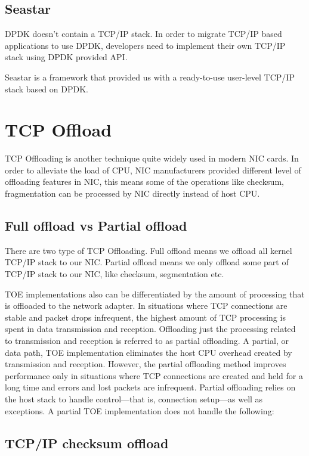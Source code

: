 \documentclass[bsc,frontabs,twoside,singlespacing,parskip,deptreport]{infthesis}     %
\begin{document}
\subsection{Seastar}
DPDK doesn't contain a TCP/IP stack. In order to migrate TCP/IP based applications to use DPDK, developers need to implement their own TCP/IP stack using DPDK provided API. 

Seastar\cite{seastar} is a framework that provided us with a ready-to-use user-level TCP/IP stack based on DPDK.


\section{TCP Offload}
TCP Offloading is another technique quite widely used in modern NIC cards. In order to alleviate the load of CPU, NIC manufacturers provided different level of offloading features in NIC, this means some of the operations like checksum, fragmentation can be processed by NIC directly instead of host CPU. 


\subsection{Full offload vs Partial offload}


There are two type of TCP Offloading. Full offload means we offload all kernel TCP/IP stack to our NIC. Partial offload means we only offload some part of TCP/IP stack to our NIC, like checksum, segmentation etc. 



TOE implementations also can be differentiated by the amount of processing that is offloaded to the network adapter. In situations where TCP connections are stable and packet drops infrequent, the highest amount of TCP processing is spent in data transmission and reception. Offloading just the processing related to transmission and reception is referred to as partial offloading. A partial, or data path, TOE implementation eliminates the host CPU overhead created by transmission and reception. However, the partial offloading method improves performance only in situations where TCP connections are created and held for a long time and errors and lost packets are infrequent. Partial offloading relies on the host stack to handle control—that is, connection setup—as well as exceptions. A partial TOE implementation does not handle the following:


\subsection{TCP/IP checksum offload}
\end{document}
